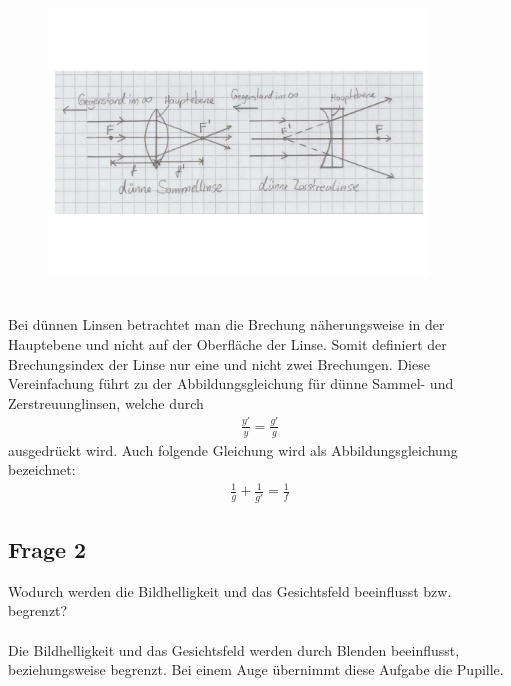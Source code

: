 \documentclass[a4paper,10pt]{scrartcl}
\begin{document}
			\\
	\begin{figure}[h]
\centering
\includegraphics[width=0.9\textwidth]{./Bilder/og9}
\end{figure}
\FloatBarrier			\\
			Bei dünnen Linsen betrachtet man die Brechung näherungsweise in der Hauptebene und nicht auf der Oberfläche der Linse. Somit definiert der Brechungsindex der Linse nur eine und nicht zwei Brechungen. Diese Vereinfachung führt zu der Abbildungsgleichung für dünne Sammel- und Zerstreuunglinsen, welche durch
			\begin{align*}
			\frac{y'}{y}=\frac{g'}{g}
			\end{align*}
			ausgedrückt wird. Auch folgende Gleichung wird als Abbildungsgleichung bezeichnet:
			\begin{align*}
			\frac{1}{g}+\frac{1}{g'}=\frac{1}{f}
			\end{align*}
			
		\subsection{Frage 2}
			Wodurch werden die Bildhelligkeit und das Gesichtsfeld beeinflusst bzw. begrenzt?\\
			\\
			Die Bildhelligkeit und das Gesichtsfeld werden durch Blenden beeinflusst, beziehungsweise begrenzt. Bei einem Auge übernimmt diese Aufgabe die Pupille.
			
\end{document}

